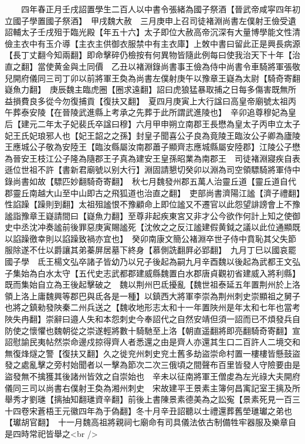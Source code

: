 　　四年春正月壬戌詔置學生二百人以中書令張緒為國子祭酒【晉武帝咸寜四年初立國子學置國子祭酒】　甲戌魏大赦　三月庚申上召司徒褚淵尚書左僕射王儉受遺詔輔太子壬戌殂于臨光殿【年五十六】太子即位大赦高帝沉深有大量博學能文性清儉主衣中有玉介導【主衣主供御衣服禁中有主衣庫】上敇中書曰留此正是興長病源【長丁丈翻今知兩翻】即命擊碎仍檢按有何異物皆隨此例每曰使我治天下十年【治直之翻】當使黄金與土同價　乙丑以褚淵錄尚書事王儉為侍中尚書令車騎將軍張敬兒開府儀同三司丁卯以前將軍王奐為尚書左僕射庚午以豫章王嶷為太尉【騎奇寄翻嶷魚力翻】　庚辰魏主臨虎圈【圈求遠翻】詔曰虎狼猛暴取捕之日每多傷害既無所益損費良多從今勿復捕貢【復扶又翻】　夏四月庚寅上大行諡曰高皇帝廟號太祖丙午葬泰安陵【在晉陵武進縣上考承之先葬于此所謂武進陵也】　辛卯追尊穆妃為皇后【建元二年太子妃裴氏卒諡曰穆】六月甲申朔立南郡王長懋為皇太子丙申立太子妃王氏妃琅邪人也【妃王韶之之孫】封皇子聞喜公子良為竟陵王臨汝公子卿為廬陵王應城公子敬為安陸王【臨汝縣屬汝南郡蕭子顯齊志應城縣屬安陸郡】江陵公子懋為晉安王枝江公子隆為隨郡王子真為建安王皇孫昭業為南郡王　司徒褚淵寢疾自表遜位世祖不許【書新君廟號以别大行】淵固請懇切癸卯以淵為司空領驃騎將軍侍中錄尚書如故【驃匹妙翻騎奇寄翻】　秋七月魏發州郡五萬人治靈丘道【靈丘道自代郡靈丘南越大山至中山即古之飛狐道也治直之翻】　吏部尚書濟陽江謐【濟子禮翻】性諂躁【躁則到翻】太祖殂謐恨不豫顧命上即位謐又不遷官以此怨望誹謗會上不豫謐詣豫章王嶷請間曰【嶷魚力翻】至尊非起疾東宮又非才公今欲作何計上知之使御史中丞沈冲奏謐前後罪惡庚寅賜謐死【沈攸之之反江謐建假黄鉞之議以此位通顯既以諂躁徼幸則以諂躁致禍亦宜也】　癸卯南康文簡公褚淵卒世子侍中賁恥其父失節服除遂不仕以爵讓其弟蓁屏居墓下終身【慕側詵翻屛必郢翻】　九月丁巳以國哀罷國子學　氐王楊文弘卒諸子皆幼乃以兄子後起為嗣九月辛酉魏以後起為武都王文弘子集始為白水太守【五代史志武都郡建威縣魏置白水郡唐貞觀初省建威入將利縣】既而集始自立為王後起擊破之　魏以荆州巴氐擾亂【魏世祖泰延五年置荆州於上洛領上洛上庸魏興等郡巴與氐各是一種】以鎮西大將軍李崇為荆州刺史崇顯祖之舅子也將之鎮勑發陜秦二州兵送之【魏收地形志太和十一年置陜州是年太和七年也當考陜失冉翻】崇辭曰邉人失和本怨刺史今奉詔代之自然安靖但須一詔而已不煩發兵自防使之懷懼也魏朝從之崇遂輕將數十騎馳至上洛【朝直遥翻將即亮翻騎奇寄翻】宣詔慰諭民夷帖然崇命邊戍掠得齊人者悉還之由是齊人亦還其生口二百許人二境交和無復烽燧之警【復扶又翻】久之徙兖州刺史兖土舊多劫盜崇命村置一樓樓皆懸鼓盜發之處亂擊之旁村始聞者以一擊為節次二次三俄頃之間聲布百里皆發人守險要由是盜發無不擒獲其後諸州皆效之自崇始也　辛未以征南將軍王僧䖍為左光祿大夫開府儀同三司以尚書右僕射王奐為湘州刺史　宋故建平王景素主簿何昌㝢記室王摛及所舉秀才劉璡【摛抽知翻璡資辛翻】前後上書陳景素德美為之訟寃【景素死見一百三十四卷宋蒼梧王元徽四年為于偽翻】冬十月辛丑詔聽以士禮還葬舊塋璡瓛之弟也【瓛胡官翻】　十一月魏高祖將親祠七廟命有司具儀法依古制備牲牢器服及樂章自是四時常祀皆舉之<br />
